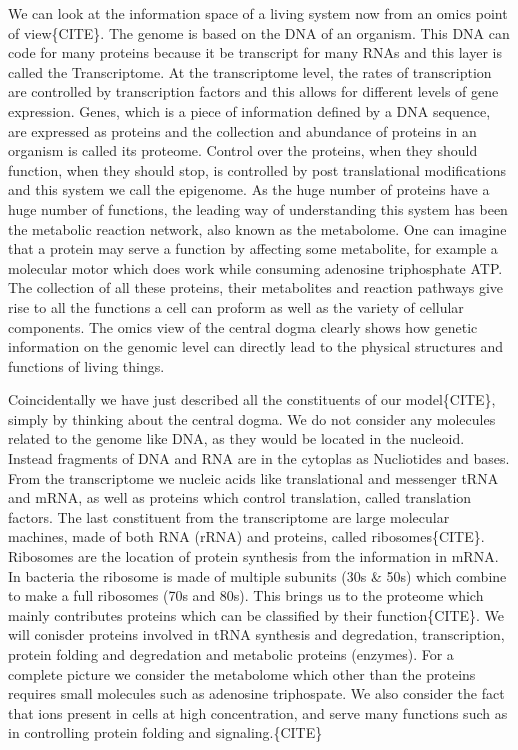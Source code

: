 \documentclass[draft, english]{volcanica-template}
\begin{document}
We can look at the information space of a living system now from an omics point of view\{CITE\}. The genome is based on the DNA of an organism. This DNA can code for many proteins because it be transcript for many RNAs and this layer is called the Transcriptome. At the transcriptome level, the rates of transcription are controlled by transcription factors and this allows for different levels of gene expression. Genes, which is a piece of information defined by a DNA sequence, are expressed as proteins and the collection and abundance of proteins in an organism is called its proteome. Control over the proteins, when they should function, when they should stop, is controlled by post translational modifications and this system we call the epigenome. As the huge number of proteins have a huge number of functions, the leading way of understanding this system has been the metabolic reaction network, also known as the metabolome. One can imagine that a protein may serve a function by affecting some metabolite, for example a molecular motor which does work while consuming adenosine triphosphate ATP. The collection of all these proteins, their metabolites and reaction pathways give rise to all the functions a cell can proform as well as the variety of cellular components. The omics view of the central dogma clearly shows how genetic information on the genomic level can directly lead to the physical structures and functions of living things.

Coincidentally we have just described all the constituents of our model\{CITE\}, simply by thinking about the central dogma. We do not consider any molecules related to the genome like DNA, as they would be located in the nucleoid. Instead fragments of DNA and RNA are in the cytoplas as Nucliotides and bases. From the transcriptome we nucleic acids like translational and messenger tRNA and mRNA, as well as proteins which control translation, called translation factors. The last constituent from the transcriptome are large molecular machines, made of both RNA (rRNA) and proteins, called ribosomes\{CITE\}. Ribosomes are the location of protein synthesis from the information in mRNA. In bacteria the ribosome is made of multiple subunits (30s \& 50s) which combine to make a full ribosomes (70s and 80s). This brings us to the proteome which mainly contributes proteins which can be classified by their function\{CITE\}. We will conisder proteins involved in tRNA synthesis and degredation, transcription, protein folding and degredation and metabolic proteins (enzymes). For a complete picture we consider the metabolome which other than the proteins requires small molecules such as adenosine triphospate. We also consider the fact that ions present in cells at high concentration, and serve many functions such as in controlling protein folding and signaling.\{CITE\}
\end{document}
